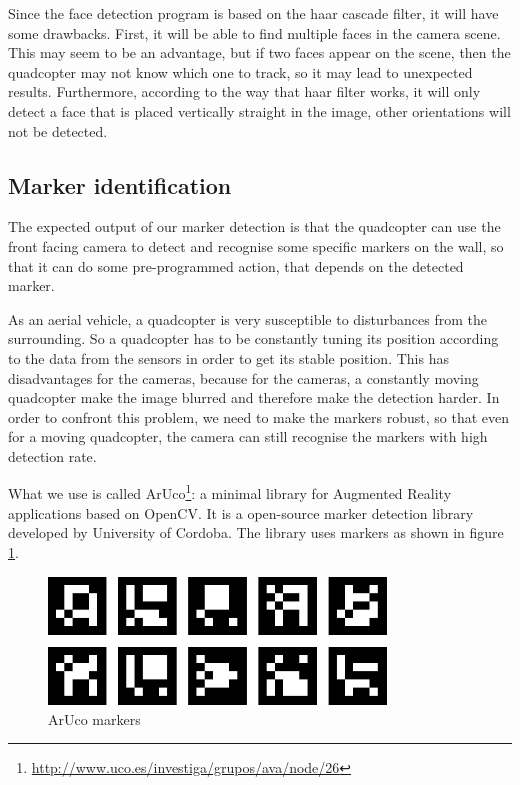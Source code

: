\documentclass[11pt, a4paper, onecolumn, oneside, parskip=half]{scrartcl}
\begin{document}
Since the face detection program is based on the haar cascade filter, it will have some drawbacks. First, it will be able to find multiple faces in the camera scene. This may seem to be an advantage, but if two faces appear on the scene, then the quadcopter may not know which one to track, so it may lead to unexpected results. Furthermore, according to the way that haar filter works, it will only detect a face that is placed vertically straight in the image, other orientations will not be detected.

\subsection{Marker identification}
\label{sec:objectives:marker}
The expected output of our marker detection is that the quadcopter can use the front facing camera to detect and recognise some specific markers on the wall, so that it can do some pre-programmed action, that depends on the detected marker. 

As an aerial vehicle, a quadcopter is very susceptible to disturbances from the surrounding. So a quadcopter has to be constantly tuning its position according to the data from the sensors in order to get its stable position. This has disadvantages for the cameras, because for the cameras, a constantly moving quadcopter make the image blurred and therefore make the detection harder. In order to confront this problem, we need to make the markers robust, so that even for a moving quadcopter, the camera can still recognise the markers with high detection rate.

What we use is called ArUco\footnote{\url{http://www.uco.es/investiga/grupos/ava/node/26}}: a minimal library for Augmented Reality applications based on OpenCV. It is a open-source marker detection library developed by University of Cordoba. The library uses markers as shown in figure \ref{fig:markers}.

\begin{figure}[ht]
\centering
\includegraphics[width=0.8\textwidth]{image00}
\caption{ArUco markers}
\label{fig:markers}
\end{figure}
\end{document}
